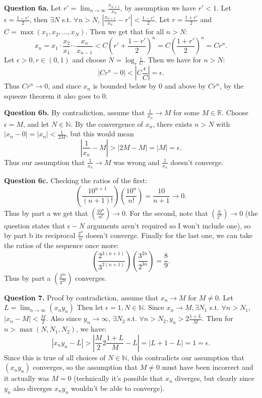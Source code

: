 \documentclass[letterpaper, reqno,11pt]{article}
\begin{document}
\newpage\phantom{blabla}
\newpage

{\medskip\noindent\bf Question 6a.} Let $r'=\lim_{n\to\infty}\frac{x_{n+1}}{x_n}$, by assumption we have $r'<1$. Let $\epsilon=\frac{1-r'}{2}$, then $\exists N$ s.t. $\forall n>N$, $\left| \frac{x_{n+1}}{x_n}-r' \right| <\frac{1-r'}{2}$. Let $r=\frac{1+r'}{2}$ and $C=\max\left( x_1,x_2,\ldots,x_N \right) $. Then we get that for all $n>N$:
\[
x_n=x_1\cdot \frac{x_{2}}{x_1}\cdots \frac{x_{n}}{x_{n-1}} < C \left( r'+ \frac{1-r'}{2} \right)^{n} =C \left(\frac{1+r'}{2}\right)^{n}=Cr^{n}
.\]
Let $\epsilon>0, r\in(0,1)$ and choose $N=\log_{r}\frac{\epsilon}{C}$. Then we have for $n>N$:
\[
|Cr^{n}-0|<\left| C \frac{\epsilon}{C} \right| =\epsilon
.\]
Thus $Cr^{n}\to 0$, and since $x_n$ is bounded below by $0$ and above by $Cr^{n}$, by the squeeze theorem it also goes to $0$.

{\medskip\noindent\bf Question 6b.} By contradiction, assume that $\frac{1}{x_n}\to M$ for some $M\in \mathbb{R}$. Choose $\epsilon=M$, and let $N\in \mathbb{N}$. By the convergence of $x_n$, there exists $n>N$ with $|x_n-0|=|x_n|< \frac{1}{2M}$, but this would mean
\[
\left| \frac{1}{x_n}-M \right| >|2M-M|=|M|=\epsilon
.\]
Thus our assumption that $\frac{1}{x_n}\to M$ was wrong and $\frac{1}{x_n}$ doesn't converge.

{\medskip\noindent\bf Question 6c.} Checking the ratios of the first:
\[
    \left( \frac{10^{n+1}}{(n+1)!} \right) \left( \frac{10^{n}}{n!} \right) =\frac{10}{n+1}\to 0
.\]
Thus by part a we get that $\left( \frac{10^{n}}{n!} \right) \to 0$. For the second, note that $\left( \frac{n}{2^{n}} \right)\to 0$ (the question states that $\epsilon-N$ arguments aren't required so I won't include one), so by part b its reciprocal $\frac{2^{n}}{n}$ doesn't converge. Finally for the last one, we can take the ratios of the sequence once more:
\[
    \left( \frac{2^{3(n+1)}}{3^{2(n+1)}} \right) \left( \frac{3^{2n}}{2^{3n}} \right)=\frac{8}{9}
.\]
Thus by part a $\left( \frac{2^{3n}}{3^{2n}} \right) $ converges.

\newpage\phantom{blabla}
\newpage

{\medskip\noindent\bf Question 7.} Proof by contradiction, assume that $x_n\to M$ for $M\neq 0$. Let $L=\lim_{n\to\infty}(x_ny_n)$ Then let $\epsilon=1, N\in \mathbb{N}$. Since $x_n\to M, \exists N_1$ s.t. $\forall n>N_1$, $|x_n-M|<\frac{M}{2}$. Also since $y_n\to\infty$, $\exists N_2$ s.t. $\forall n>N_2,y_n>2\frac{1+L}{M}$. Then for $n>\max(N,N_1,N_2)$, we have:
\[
|x_ny_n-L|>\left| \frac{M}{2}2\frac{1+L}{M}-L \right| =|L+1-L|=1=\epsilon
.\]
Since this is true of all choices of $N\in \mathbb{N}$, this contradicts our assumption that $\left( x_ny_n \right) $ converges, so the assumption that $M\neq 0$ must have been incorrect and it actually was $M=0$ (technically it's possible that $x_n$ diverges, but clearly since $y_n$ also diverges $x_ny_n$ wouldn't be able to converge).
\end{document}
